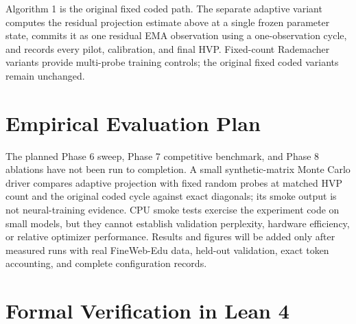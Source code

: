 \documentclass[11pt,a4paper]{article}
\theoremstyle{definition}
\theoremstyle{remark}
\begin{document}
Algorithm 1 is the original fixed coded path. The separate adaptive variant computes the residual projection estimate above at a single frozen parameter state, commits it as one residual EMA observation using a one-observation cycle, and records every pilot, calibration, and final HVP. Fixed-count Rademacher variants provide multi-probe training controls; the original fixed coded variants remain unchanged.

\section{Empirical Evaluation Plan}

The planned Phase 6 sweep, Phase 7 competitive benchmark, and Phase 8 ablations have not been run to completion. A small synthetic-matrix Monte Carlo driver compares adaptive projection with fixed random probes at matched HVP count and the original coded cycle against exact diagonals; its smoke output is not neural-training evidence. CPU smoke tests exercise the experiment code on small models, but they cannot establish validation perplexity, hardware efficiency, or relative optimizer performance. Results and figures will be added only after measured runs with real FineWeb-Edu data, held-out validation, exact token accounting, and complete configuration records.

\section{Formal Verification in Lean 4}
\end{document}
